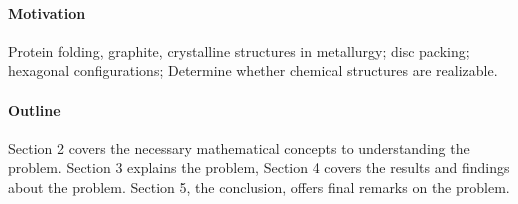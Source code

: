 \paragraph{Motivation}
Protein folding, graphite, crystalline structures in metallurgy; disc packing;
hexagonal configurations;  Determine whether chemical structures are realizable.
\paragraph{Outline}
Section 2 covers the necessary mathematical concepts to understanding the
problem.  Section 3 explains the problem, Section 4 covers the results and
findings about the problem.  Section 5, the conclusion, offers final remarks on
the problem.
